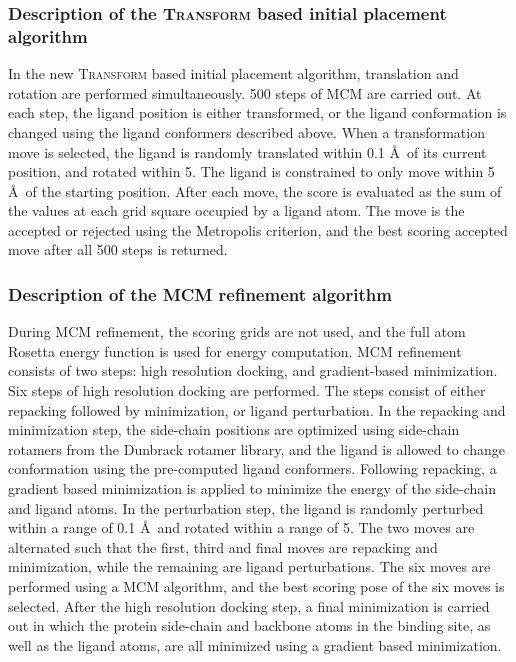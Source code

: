 \subsubsection{Description of the \textsc{Transform} based initial placement algorithm}

In the new \textsc{Transform} based initial placement algorithm, translation and rotation are performed simultaneously.
500 steps of MCM are carried out.
At each step, the ligand position is either transformed, or the ligand conformation is changed using the ligand conformers described above.
When a transformation move is selected, the ligand is randomly translated within 0.1 \AA\ of its current position, and rotated within 5\textdegree.
The ligand is constrained to only move within 5 \AA\ of the starting position.
After each move, the score is evaluated as the sum of the values at each grid square occupied by a ligand atom.
The move is the accepted or rejected using the Metropolis criterion, and the best scoring accepted move after all 500 steps is returned.

\subsubsection{Description of the MCM refinement algorithm}
During MCM refinement, the scoring grids are not used, and the full atom Rosetta energy function is used for energy computation.
MCM refinement consists of two steps: high resolution docking, and gradient-based minimization.
Six steps of high resolution docking are performed. The steps consist of either repacking followed by minimization, or ligand perturbation.
In the repacking and minimization step, the side-chain positions are optimized using side-chain rotamers from the Dunbrack rotamer library\citep{Shapovalov:2011bw}, and the ligand is allowed to change conformation using the pre-computed ligand conformers.
Following repacking, a gradient based minimization is applied to minimize the energy of the side-chain and ligand atoms.
In the perturbation step, the ligand is randomly perturbed within a range of 0.1 \AA\ and rotated within a range of 5\textdegree.
The two moves are alternated such that the first, third and final moves are repacking and minimization, while the remaining are ligand perturbations. The six moves are performed using a MCM algorithm, and the best scoring pose of the six moves is selected.
After the high resolution docking step, a final minimization is carried out in which the protein side-chain and backbone atoms in the binding site, as well as the ligand atoms, are all minimized using a gradient based minimization.

